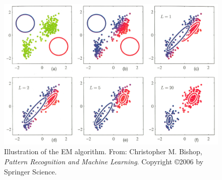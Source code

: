 \begin{figure}[!h]
\begin{center}
\noindent \includegraphics[scale=0.2]{figures/mixture_model} 
\newline
\caption{Illustration of the EM algorithm. From: Christopher M. Bishop, \textit{Pattern Recognition and Machine Learning}. Copyright \copyright  2006 by Springer Science.}
\label{mixture_model}
\end{center} 
\end{figure}
\pagebreak
